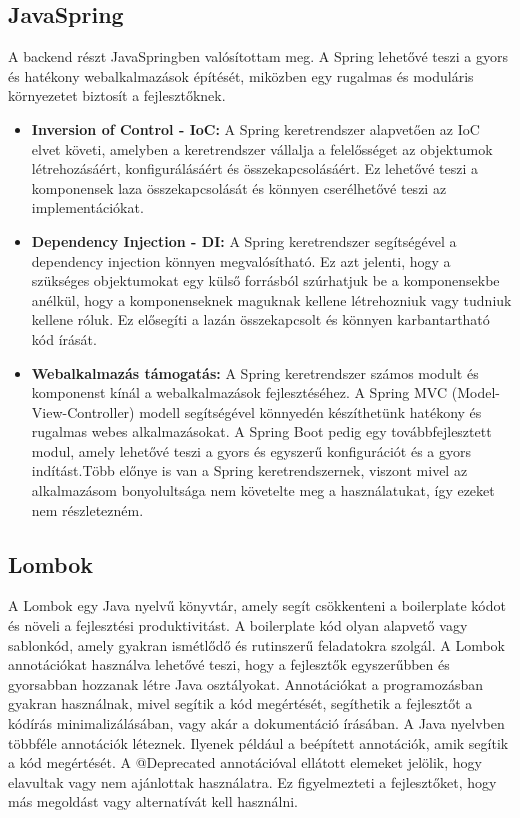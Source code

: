\documentclass[a4paper,twoside]{article}
\begin{document}
\subsection{JavaSpring}
A backend részt JavaSpringben\cite{javaspring} valósítottam meg. A Spring lehetővé teszi a gyors és hatékony
webalkalmazások építését, miközben egy rugalmas és moduláris környezetet biztosít a
fejlesztőknek.
\begin{itemize}
	\item  \textbf{Inversion of Control - IoC:} A Spring keretrendszer alapvetően az IoC elvet követi,
	amelyben a keretrendszer vállalja a felelősséget az objektumok létrehozásáért,
	konfigurálásáért és összekapcsolásáért. Ez lehetővé teszi a komponensek laza
	összekapcsolását és könnyen cserélhetővé teszi az implementációkat.
	\item \textbf{Dependency Injection - DI:} A Spring keretrendszer segítségével a dependency
	injection könnyen megvalósítható. Ez azt jelenti, hogy a szükséges objektumokat egy
	külső forrásból szúrhatjuk be a komponensekbe anélkül, hogy a komponenseknek
	maguknak kellene létrehozniuk vagy tudniuk kellene róluk. Ez elősegíti a lazán
	összekapcsolt és könnyen karbantartható kód írását.
	\item \textbf{Webalkalmazás támogatás:} A Spring keretrendszer számos modult és komponenst
	kínál a webalkalmazások fejlesztéséhez. A Spring MVC (Model-View-Controller)
	modell segítségével könnyedén készíthetünk hatékony és rugalmas webes
	alkalmazásokat. A Spring Boot pedig egy továbbfejlesztett modul, amely lehetővé
	teszi a gyors és egyszerű konfigurációt és a gyors indítást.Több előnye is van a Spring
	keretrendszernek, viszont mivel az alkalmazásom bonyolultsága nem követelte meg a
	használatukat, így ezeket nem részletezném.
\end{itemize}

\subsection{Lombok}
A Lombok\cite{lombok}  egy Java nyelvű könyvtár, amely
segít csökkenteni a boilerplate kódot és növeli a fejlesztési produktivitást. A boilerplate kód olyan alapvető vagy sablonkód, amely gyakran
ismétlődő és rutinszerű feladatokra szolgál. A Lombok annotációkat használva lehetővé teszi, hogy a fejlesztők egyszerűbben és gyorsabban hozzanak létre Java osztályokat. Annotációkat a programozásban gyakran használnak, mivel segítik a kód megértését, segíthetik a fejlesztőt a kódírás minimalizálásában, vagy akár a
dokumentáció írásában. A Java nyelvben többféle annotációk léteznek. Ilyenek például a beépített annotációk, amik segítik a kód
megértését. A @Deprecated annotációval ellátott elemeket jelölik, hogy elavultak vagy nem ajánlottak használatra. Ez figyelmezteti a fejlesztőket, hogy más megoldást vagy alternatívát kell használni.
\newpage
\end{document}
